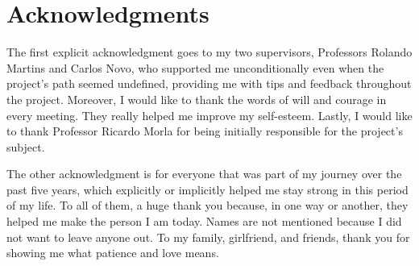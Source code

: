 \chapter*{Acknowledgments}

The first explicit acknowledgment goes to my two supervisors, Professors Rolando Martins and Carlos Novo, who supported me unconditionally even when the project's path seemed undefined, providing me with tips and feedback throughout the project. Moreover, I would like to thank the words of will and courage in every meeting. They really helped me improve my self-esteem. Lastly, I would like to thank Professor Ricardo Morla for being initially responsible for the project's subject.  


The other acknowledgment is for everyone that was part of my journey over the past five years, which explicitly or implicitly helped me stay strong in this period of my life. To all of them, a huge thank you because, in one way or another, they helped me make the person I am today. Names are not mentioned because I did not want to leave anyone out. To my family, girlfriend, and friends, thank you for showing me what patience and love means.

\vspace{10mm}
